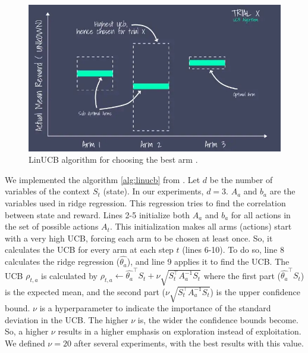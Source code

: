 \begin{figure}[!htb]
    \centering
    \includegraphics[scale=0.58]{Images/Learning_compensations/linucb.jpg}
    \caption[LinUCB algorithm for choosing the best arm.]{LinUCB algorithm for choosing the best arm \cite{recommender2020}.}
    \label{fig:linucb}
\end{figure}

We implemented the algorithm \ref{alg:linucb} from \cite{li2010contextual}. Let $d$ be the number of variables of the context $S_t$ (state). In our experiments, $d=3$. $A_a$ and $b_a$ are the variables used in ridge regression. This regression tries to find the correlation between state and reward. Lines 2-5 initialize both $A_a$ and $b_a$ for all actions in the set of possible actions $A_t$. This initialization makes all arms (actions) start with a very high UCB, forcing each arm to be chosen at least once. So, it calculates the UCB for every arm at each step $t$ (lines 6-10). To do so, line 8 calculates the ridge regression ($\hat{\theta_a}$), and line 9 applies it to find the UCB. The UCB $\rho_{t, a}$ is calculated by $\rho_{t, a} \leftarrow \hat{\theta_a}^\top S_t + \nu \sqrt{S_t^\top A_{a}^{-1} S_t}$ where the first part ($\hat{\theta_a}^\top S_t$) is the expected mean, and the second part ($\nu \sqrt{S_t^\top A_{a}^{-1} S_t}$) is the upper confidence bound. $\nu$ is a hyperparameter to indicate the importance of the standard deviation in the UCB. The higher $\nu$ is, the wider the confidence bounds become. So, a higher $\nu$ results in a higher emphasis on exploration instead of exploitation. We defined $\nu = 20$ after several experiments, with the best results with this value.

